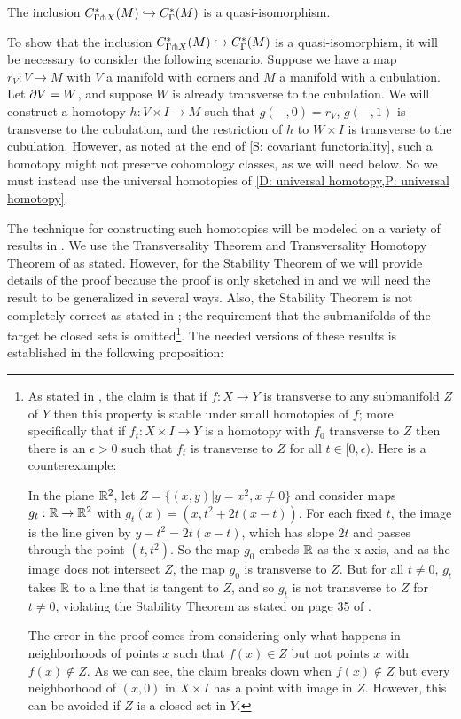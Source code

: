 \begin{theorem}\label{T: transverse complex}
	The inclusion $C^*_{\Gamma \pitchfork X}(M) \hookrightarrow C^*_\Gamma(M)$ is a quasi-isomorphism.
\end{theorem}

To show that the inclusion $C^*_{\Gamma \pitchfork X}(M) \hookrightarrow C^*_\Gamma(M)$ is a quasi-isomorphism, it will be necessary to consider the following scenario.
Suppose we have a map $r_V \colon V \to M$ with $V$ a manifold with corners and $M$ a manifold with a cubulation.
Let $\partial V = W$, and suppose $W$ is already transverse to the cubulation.
We will construct a homotopy $h \colon V \times I \to M$ such that $g(-,0) = r_V$, $g(-,1)$ is transverse to the cubulation, and the restriction of $h$ to $W \times I$ is transverse to the cubulation. However, as noted at the end of \cref{S: covariant functoriality}, such a homotopy might not preserve cohomology classes, as we will need below. So we must instead use the universal homotopies of \cref{D: universal homotopy,P: universal homotopy}.


The technique for constructing such homotopies will be modeled on a variety of results in \cite{GuPo74}.
We use the Transversality Theorem and Transversality Homotopy Theorem of \cite[Section 2.3]{GuPo74} as stated.
However, for the Stability Theorem of \cite[Section 1.6]{GuPo74} we will provide details of the proof because the proof is only sketched in \cite{GuPo74} and we will need the result to be generalized in several ways.
Also, the Stability Theorem is not completely correct as stated in \cite[Section 1.6]{GuPo74}; the requirement that the submanifolds of the target be closed sets is omitted\footnote{As stated in \cite{GuPo74}, the claim is that if $f \colon X \to Y$ is transverse to any submanifold $Z$ of $Y$ then this property is stable under small homotopies of $f$; more specifically that if $f_t:X \times I \to Y$ is a homotopy with $f_0$ transverse to $Z$ then there is an $\epsilon>0$ such that $f_t$ is transverse to $Z$ for all $t\in[0,\epsilon)$.
Here is a counterexample:

In the plane $\mathbb{R}^2$, let $Z = \{(x,y)|y = x^2, x\neq 0\}$ and consider maps $g_t: \mathbb{R} \to \mathbb{R}^2$ with
$g_t(x) = (x,t^2+2t(x-t))$.
For each fixed $t$, the image is the line given by $y-t^2 = 2t(x-t)$, which has slope $2t$ and passes through the point $(t,t^2)$.
So the map $g_0$ embeds $\mathbb{R}$ as the x-axis, and as the image does not intersect $Z$, the map $g_0$ is transverse to $Z$.
But for all $t\neq 0$, $g_t$ takes $\mathbb{R}$ to a line that is tangent to $Z$, and so $g_t$ is not transverse to $Z$ for $t\neq 0$, violating the Stability Theorem as stated on page 35 of \cite{GuPo74}.

The error in the proof comes from considering only what happens in neighborhoods of points $x$ such that $f(x) \in Z$ but not points $x$ with $f(x)\notin Z$.
As we can see, the claim breaks down when $f(x)\notin Z$ but every neighborhood of $(x,0)$ in $X \times I$ has a point with image in $Z$.
However, this can be avoided if $Z$ is a closed set in $Y$.}.
The needed versions of these results is established in the following proposition:

